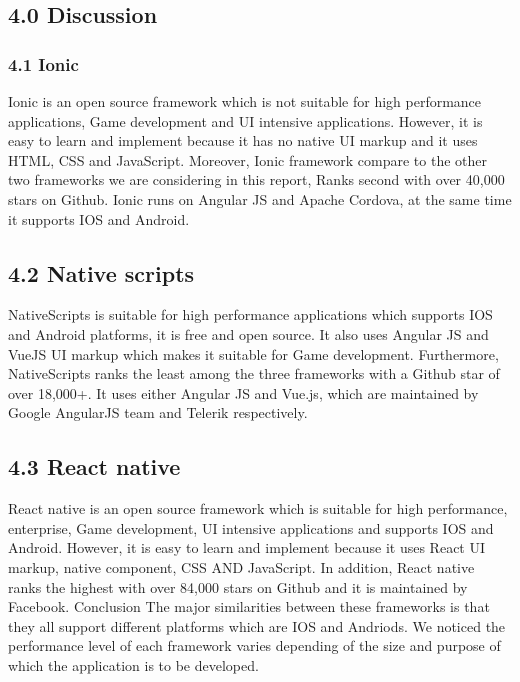 \documentclass[12pt]{extreport}
\begin{document}
\newpage
\subsection*{4.0 Discussion}
\subsubsection*{4.1 Ionic} 
Ionic is an open source framework which is not suitable for high performance applications, Game development and UI intensive applications. However, it is easy to learn and implement because it has no native UI markup and it uses HTML, CSS and JavaScript.
Moreover, Ionic framework compare to the other two frameworks we are considering in this report, Ranks second with over 40,000 stars on Github. Ionic runs on Angular JS and Apache Cordova, at the same time it supports IOS and Android.
\subsection*{4.2 Native scripts}
NativeScripts is suitable for high performance applications which supports IOS and Android platforms, it is free and open source. It also uses Angular JS and VueJS UI markup which makes it suitable for Game development.
Furthermore, NativeScripts ranks the least among the three frameworks with a Github star of over 18,000+. It uses either Angular JS and Vue.js, which are maintained by Google AngularJS team and Telerik respectively.
\subsection*{4.3 React native} 
React native is an open source framework which is suitable for high performance, enterprise, Game development, UI intensive applications and supports IOS and Android. However, it is easy to learn and implement because it uses React UI markup, native component, CSS AND JavaScript.
In addition, React native ranks the highest with over 84,000 stars on Github and it is maintained by Facebook.
Conclusion
The major similarities between these frameworks is that they all support different platforms which are IOS and Andriods. We noticed the performance level of each framework varies depending of the size and purpose of which the application is to be developed. 


\nolinenumbers
\end{document}

